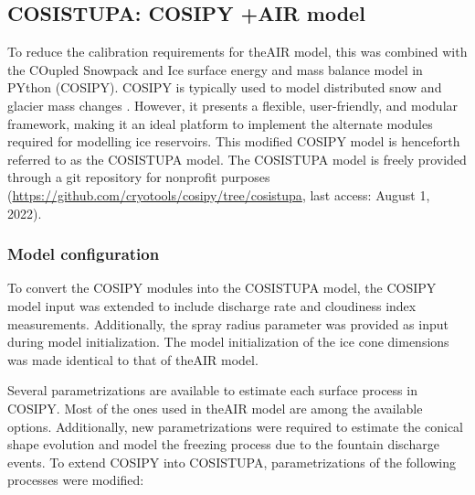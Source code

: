 \subsection{COSISTUPA: COSIPY +\ac{AIR} model}
\label{sec:Cosistupa}

To reduce the calibration requirements for the\ac{AIR} model, this was combined with the COupled
Snowpack and Ice surface energy and mass balance model in PYthon (COSIPY). COSIPY is typically used to
model distributed snow and glacier mass changes \citep{sauterCOSIPYV1Opensource2020}. However, it presents a
flexible, user-friendly, and modular framework, making it an ideal platform to implement the alternate
modules required for modelling ice reservoirs. This modified COSIPY model is henceforth referred to as the COSISTUPA model. The COSISTUPA model is freely provided through a git repository for nonprofit purposes
(\url{https://github.com/cryotools/cosipy/tree/cosistupa}, last access: August 1, 2022). 


\subsubsection{Model configuration}

To convert the COSIPY modules into the COSISTUPA model, the COSIPY model input was extended to include discharge rate and cloudiness index measurements. Additionally, the spray radius parameter was provided as input during model initialization. The model initialization of the ice
cone dimensions was made identical to that of the\ac{AIR} model.

Several parametrizations are available to estimate each surface process in COSIPY. Most of the ones
used in the\ac{AIR} model are among the available options. Additionally, new parametrizations were required to
estimate the conical shape evolution and model the freezing process due to the fountain discharge events. To
extend COSIPY into COSISTUPA, parametrizations of the following processes were modified:

